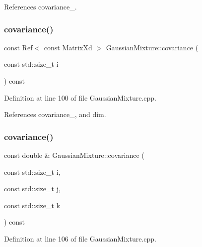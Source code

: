 References covariance\+\_\+.

\mbox{\label{classbfl_1_1GaussianMixture_a3cff0f507ed950fe6a5e0aba1bf8467a}} 
\subsubsection{\texorpdfstring{covariance()}{covariance()}\hspace{0.1cm}{\footnotesize\ttfamily [5/6]}}
{\footnotesize\ttfamily const Ref$<$ const Matrix\+Xd $>$ Gaussian\+Mixture\+::covariance (\begin{DoxyParamCaption}\item[{const std\+::size\+\_\+t}]{i }\end{DoxyParamCaption}) const}



Definition at line 100 of file Gaussian\+Mixture.\+cpp.



References covariance\+\_\+, and dim.

\mbox{\label{classbfl_1_1GaussianMixture_a4ca0b098be0fc923f454e73e9dccf78f}} 
\subsubsection{\texorpdfstring{covariance()}{covariance()}\hspace{0.1cm}{\footnotesize\ttfamily [6/6]}}
{\footnotesize\ttfamily const double \& Gaussian\+Mixture\+::covariance (\begin{DoxyParamCaption}\item[{const std\+::size\+\_\+t}]{i,  }\item[{const std\+::size\+\_\+t}]{j,  }\item[{const std\+::size\+\_\+t}]{k }\end{DoxyParamCaption}) const}



Definition at line 106 of file Gaussian\+Mixture.\+cpp.



